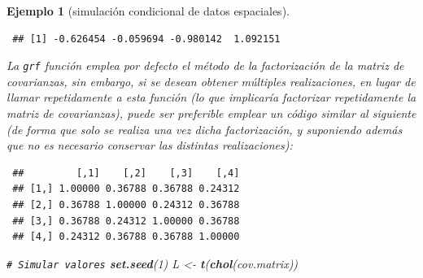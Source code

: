 \documentclass[
  spanish,
  10pt,
]{book}
\newenvironment{Shaded}{\begin{snugshade}}{\end{snugshade}}
\newcommand{\AttributeTok}[1]{\textcolor[rgb]{0.13,0.29,0.53}{#1}}
\newcommand{\CommentTok}[1]{\textcolor[rgb]{0.56,0.35,0.01}{\textit{#1}}}
\newcommand{\DecValTok}[1]{\textcolor[rgb]{0.00,0.00,0.81}{#1}}
\newcommand{\FunctionTok}[1]{\textcolor[rgb]{0.13,0.29,0.53}{\textbf{#1}}}
\newcommand{\NormalTok}[1]{#1}
\newcommand{\OtherTok}[1]{\textcolor[rgb]{0.56,0.35,0.01}{#1}}
\newcommand{\SpecialCharTok}[1]{\textcolor[rgb]{0.81,0.36,0.00}{\textbf{#1}}}
\theoremstyle{break}
\newtheorem{example}{Ejemplo}[chapter]
\theoremstyle{nonumberplain}
\renewcommand{\CommentTok}[1]{\textcolor[rgb]{0.41,0.41,0.41}{\texttt{#1}}}
\begin{document}
\begin{example}[simulación condicional de datos espaciales]
\begin{verbatim}
 ## [1] -0.626454 -0.059694 -0.980142  1.092151
\end{verbatim}

La \texttt{grf} función emplea por defecto el método de la factorización de la matriz de covarianzas,
sin embargo, si se desean obtener múltiples realizaciones, en lugar de llamar repetidamente a esta función (lo que implicaría factorizar repetidamente la matriz de covarianzas),
puede ser preferible emplear un código similar al siguiente (de forma que solo se realiza una vez dicha factorización, y suponiendo además que no es necesario conservar las distintas realizaciones):

\begin{Shaded}
\end{Shaded}

\begin{verbatim}
 ##         [,1]    [,2]    [,3]    [,4]
 ## [1,] 1.00000 0.36788 0.36788 0.24312
 ## [2,] 0.36788 1.00000 0.24312 0.36788
 ## [3,] 0.36788 0.24312 1.00000 0.36788
 ## [4,] 0.24312 0.36788 0.36788 1.00000
\end{verbatim}

\begin{Shaded}
\begin{Highlighting}[]
\CommentTok{\# Simular valores}
\FunctionTok{set.seed}\NormalTok{(}\DecValTok{1}\NormalTok{)}
\NormalTok{L }\OtherTok{\textless{}{-}} \FunctionTok{t}\NormalTok{(}\FunctionTok{chol}\NormalTok{(cov.matrix))}


\end{Highlighting}
\end{Shaded}
\end{example}
\end{document}
